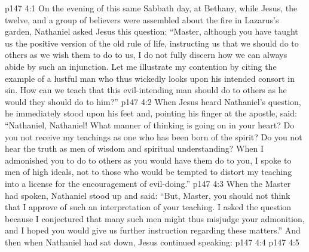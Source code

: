 \vs p147 4:1 On the evening of this same Sabbath day, at Bethany, while Jesus, the twelve, and a group of believers were assembled about the fire in Lazarus’s garden, Nathaniel asked Jesus this question: “Master, although you have taught us the positive version of the old rule of life, instructing us that we should do to others as we wish them to do to us, I do not fully discern how we can always abide by such an injunction. Let me illustrate my contention by citing the example of a lustful man who thus wickedly looks upon his intended consort in sin. How can we teach that this evil\hyp{}intending man should do to others as he would they should do to him?”
\vs p147 4:2 When Jesus heard Nathaniel’s question, he immediately stood upon his feet and, pointing his finger at the apostle, said: “Nathaniel, Nathaniel! What manner of thinking is going on in your heart? Do you not receive my teachings as one who has been born of the spirit? Do you not hear the truth as men of wisdom and spiritual understanding? When I admonished you to do to others as you would have them do to you, I spoke to men of high ideals, not to those who would be tempted to distort my teaching into a license for the encouragement of evil\hyp{}doing.”
\vs p147 4:3 When the Master had spoken, Nathaniel stood up and said: “But, Master, you should not think that I approve of such an interpretation of your teaching. I asked the question because I conjectured that many such men might thus misjudge your admonition, and I hoped you would give us further instruction regarding these matters.” And then when Nathaniel had sat down, Jesus continued speaking: 
\vs p147 4:4 
\vs p147 4:5 \pc {}
